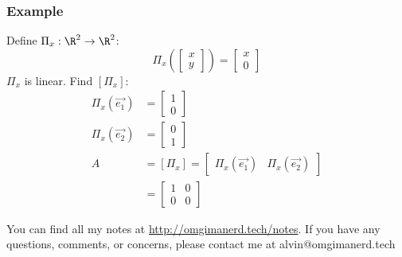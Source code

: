 \documentclass[letterpaper, 12pt]{math}
\begin{document}
\subsubsection*{Example}
Define \( \Pi_x:\R^2\to\R^2 \):
\[ \Pi_x\left(\begin{bmatrix}x \\ y\end{bmatrix}\right) = \begin{bmatrix}x \\
  0\end{bmatrix} \]
\( \Pi_x \) is linear. Find \( [\Pi_x] \):
\begin{align*}
  \Pi_x(\vec{e_1}) &= \begin{bmatrix}1 \\ 0\end{bmatrix} \\
  \Pi_x(\vec{e_2}) &= \begin{bmatrix}0 \\ 1\end{bmatrix} \\
  A &= [\Pi_x] = \begin{bmatrix}
    \Pi_x(\vec{e_1}) & \Pi_x(\vec{e_2})
  \end{bmatrix} \\
  &= \begin{bmatrix}
    1 & 0 \\
    0 & 0
  \end{bmatrix}
\end{align*}

\begin{center}
  You can find all my notes at \url{http://omgimanerd.tech/notes}. If you have
  any questions, comments, or concerns, please contact me at
  alvin@omgimanerd.tech
\end{center}
\end{document}
